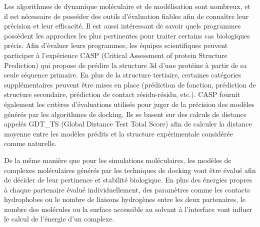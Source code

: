 Les algorithmes de dynamique moléculaire et de modélisation sont nombreux, et il est nécessaire de posséder des outils d'évaluation fiables afin de connaître leur précision et leur efficacité. Il est aussi intéressant de savoir quels programmes possèdent les approches les plus pertinentes pour traiter certains cas biologiques précis. Afin d'évaluer leurs programmes, les équipes scientifiques peuvent participer à l'expérience CASP (Critical Assessment of protein Structure Prediction) qui propose de prédire la structure 3d d'une protéine à partir de sa seule séquence primaire. En plus de la structure tertiaire, certaines catégories supplémentaires peuvent être mises en place (prédiction de fonction, prédiction de structure secondaire, prédiction de contact résidu-résidu, etc.). CASP fournit également les critères d'évaluations utilisés pour juger de la précision des modèles générés par les algorithmes de docking. Ils se basent sur des calculs de distance appelés GDT\_TS (Global Distance Test Total Score) afin de calculer la distance moyenne entre les modèles prédits et la structure expérimentale considérée comme naturelle. 

De la même manière que pour les simulations moléculaires, les modèles de complexes moléculaires générés par les techniques de docking vont être évalué afin de décider de leur pertinence et stabilité biologique.
En plus des énergies propres à chaque partenaire évalué individuellement, des paramètres comme les contacts hydrophobes ou le nombre de liaisons hydrogènes entre les deux partenaires, le nombre des molécules ou la surface accessible au solvant à l'interface vont influer le calcul de l'énergie d'un complexe. 



